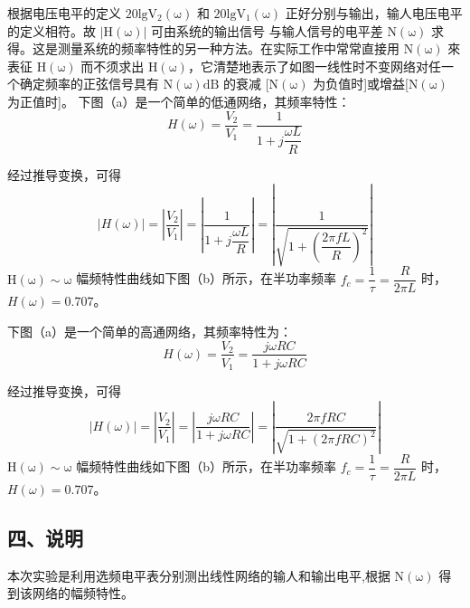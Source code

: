 \documentclass[dvipsnames, svgnames,a4paper,11pt]{article}
\begin{document}
根据电压电平的定义 $\mathrm{20lgV_2(\omega)}$ 和 $\mathrm{20lgV_1(\omega)}$ 正好分别与输出，输人电压电平的定义相符。故 $\mathrm{|H(\omega)|}$ 可由系统的输出信号 与输人信号的电平差 $\mathrm{N(\omega)}$ 求得。这是测量系统的频率特性的另一种方法。在实际工作中常常直接用 $\mathrm{N(\omega)}$ 來表征 $\mathrm{H(\omega)}$ 而不须求出 $\mathrm{H(\omega)}$，它清楚地表示了如图一线性时不变网络对任一个确定频率的正弦信号具有 $\mathrm{N(\omega)dB}$ 的衰减 [$\mathrm{N(\omega)}$ 为负值时]或增益[$\mathrm{N(\omega)}$ 为正值时]。
下图（a）是一个简单的低通网络，其频率特性：
\begin{equation}
  H(\omega) = \dfrac{V_2}{V_1} = \dfrac{1}{1 + j\dfrac{\omega L}{R}}
\end{equation}

经过推导变换，可得
\begin{equation}
  \left |H(\omega) \right | = \left |\dfrac{V_2}{V_1} \right | = \left |\dfrac{1}{1 + j\dfrac{\omega L}{R}}\right | = \left | \dfrac{1}{\sqrt{1 + (\dfrac{2\pi fL}{R})^2}} \right |
\end{equation}
$\mathrm{H(\omega) \sim \omega}$ 幅频特性曲线如下图（b）所示，在半功率频率 $f_c = \dfrac{1}{\tau} = \dfrac{R}{2\pi L}$ 时，$H(\omega) = 0.707$。

下图（a）是一个简单的高通网络，其频率特性为：
\begin{equation}
  H(\omega) = \dfrac{V_2}{V_1} = \dfrac{j\omega RC}{1 + j\omega RC}
\end{equation}

经过推导变换，可得
\begin{equation}
  \left |H(\omega) \right | = \left |\dfrac{V_2}{V_1} \right | = \left |\dfrac{j\omega RC}{1 + j\omega RC}\right | = \left | \dfrac{2\pi fRC}{\sqrt{1 + (2\pi fRC)^2}} \right |
\end{equation}
$\mathrm{H(\omega) \sim \omega}$ 幅频特性曲线如下图（b）所示，在半功率频率 $f_c = \dfrac{1}{\tau} = \dfrac{R}{2\pi L}$ 时，$H(\omega) = 0.707$。

\begin{figure}[htbp]
	\centering
	\caption{}
\end{figure}

\subsection*{四、说明}
本次实验是利用选频电平表分别测出线性网络的输人和输出电平,根据 $\mathrm{N(\omega)}$ 得到该网络的幅频特性。
\end{document}
